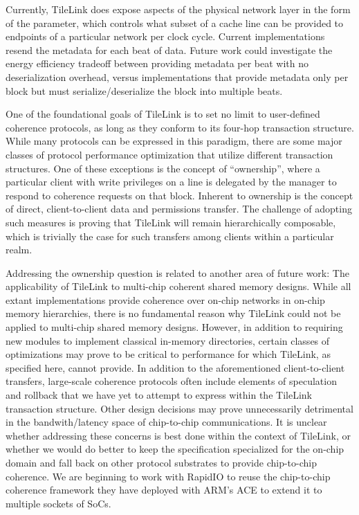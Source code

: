 Currently, TileLink does expose aspects of the physical network layer in the form of the  parameter, which
controls what subset of a cache line can be provided to endpoints of a particular network per clock cycle.
Current implementations resend the metadata for each beat of data.
Future work could investigate the energy efficiency tradeoff between providing metadata per beat with no deserialization overhead,
versus implementations that provide metadata only per block but must serialize/deserialize the block into multiple beats. 

One of the foundational goals of TileLink is to set no limit to user-defined coherence protocols, as long as they conform to
its four-hop transaction structure.
While many protocols can be expressed in this paradigm, there are some major classes of protocol performance optimization that
utilize different transaction structures.
One of these exceptions is the concept of ``ownership'', where a particular client with write privileges on a line is delegated by the manager
to respond to coherence requests on that block.
Inherent to ownership is the concept of direct, client-to-client data and permissions transfer.
The challenge of adopting such measures is proving that TileLink will remain hierarchically composable,
which is trivially the case for such transfers among clients within a particular realm.

Addressing the ownership question is related to another area of future work:
The applicability of TileLink to multi-chip coherent shared memory designs.
While all extant implementations provide coherence over on-chip networks in on-chip memory hierarchies,
there is no fundamental reason why TileLink could not be applied to multi-chip shared memory designs.
However, in addition to requiring new modules to implement classical in-memory directories,
certain classes of optimizations may prove to be critical to performance for which TileLink, as specified here, cannot provide.
In addition to the aforementioned client-to-client transfers, large-scale coherence protocols often include
elements of speculation and rollback that we have yet to attempt to express within the TileLink transaction structure.
Other design decisions may prove unnecessarily detrimental in the bandwith/latency space of chip-to-chip communications.
It is unclear whether addressing these concerns is best done within the context of TileLink, or whether we would
do better to keep the specification specialized for the on-chip domain and fall back on other
protocol substrates to provide chip-to-chip coherence.
We are beginning to work with RapidIO to reuse the chip-to-chip coherence framework
they have deployed with ARM's ACE to extend it to multiple sockets of SoCs.


